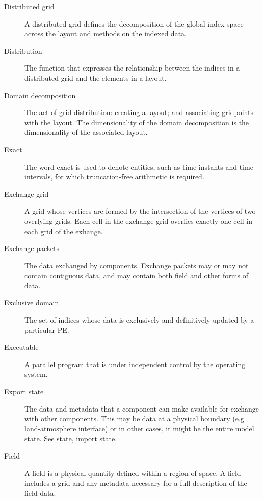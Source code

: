 \begin{description}
\item[Distributed grid] \label{glos:DistGrid}
  A distributed grid defines the decomposition of the global index space 
  across the layout and methods on the indexed data.

\item[Distribution] \label{glos:Distribution} The function that expresses
the relationship between the indices in a distributed grid and the elements 
in a layout.  

\item[Domain decomposition] \label{glos:DomainDecomp} The act of grid 
  distribution: creating a layout; and associating gridpoints with the layout. 
  The dimensionality of the domain decomposition is the dimensionality of 
  the associated layout.

\item [Exact] \label{glos:Exact} The word exact is used
to denote entities, such as time instants and time intervals, for which truncation-free arithmetic is required. 

\item[Exchange grid] \label{glos:ExchangeGrid} A grid whose vertices are
formed by the intersection of the vertices of two overlying grids.  Each 
cell in the exchange grid overlies exactly one cell in each grid of the 
exhange.

\item[Exchange packets] \label{glos:EP} The data exchanged by components.  
  Exchange packets may or may not contain contiguous data, and may contain 
  both field and other forms of data.

\item[Exclusive domain] \label{glos:ExcDomain} The set of indices whose 
  data is exclusively and definitively updated by a particular PE.

\item[Executable] \label{glos:Exec} 
  A parallel program that is under independent control by the operating 
  system.

\item[Export state] \label{glos:ExportState} The data and 
  metadata that a component can make available for exchange 
  with other components. This may be data at a physical boundary 
  (e.g land-atmosphere interface) or in other cases, it might be the 
  entire model state.  See state, import state.

\item[Field] \label{glos:Field} A field is a physical quantity
  defined within a region of space.  A field includes a grid 
  and any metadata necessary for a full description of the field data.


\end{description}
